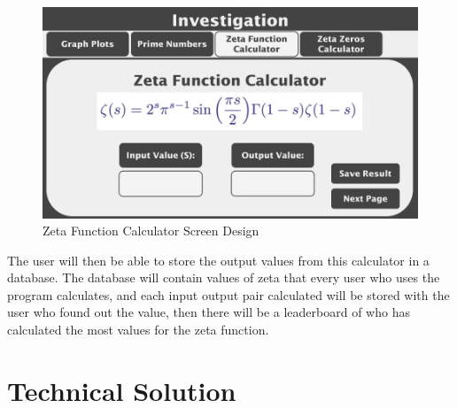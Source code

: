 \documentclass{article}
\begin{document}
\begin{figure}[h]
    \centering
    \includegraphics[scale=0.18]{zeta-function-calculator-screen-design}
    \caption{Zeta Function Calculator Screen Design}
\end{figure}

The user will then be able to store the output values from this calculator in a database. The database will contain values of zeta that every user who uses the program calculates, and each input output pair calculated will be stored with the user who found out the value, then there will be a leaderboard of who has calculated the most values for the zeta function.


\clearpage
\section{Technical Solution}
\end{document}
